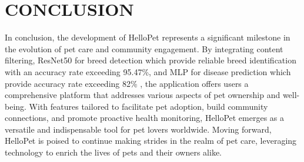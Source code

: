 \section{CONCLUSION}
In conclusion, the development of HelloPet represents a significant milestone in the evolution of pet care and community engagement. By integrating content filtering, ResNet50 for breed detection which provide reliable breed identification with an accuracy rate exceeding 95.47\%, and MLP for disease prediction which provide accuracy rate exceeding 82\% , the application offers users a comprehensive platform that addresses various aspects of pet ownership and well-being. With features tailored to facilitate pet adoption, build community connections, and promote proactive health monitoring, HelloPet emerges as a versatile and indispensable tool for pet lovers worldwide. Moving forward, HelloPet is poised to continue making strides in the realm of pet care, leveraging technology to enrich the lives of pets and their owners alike.